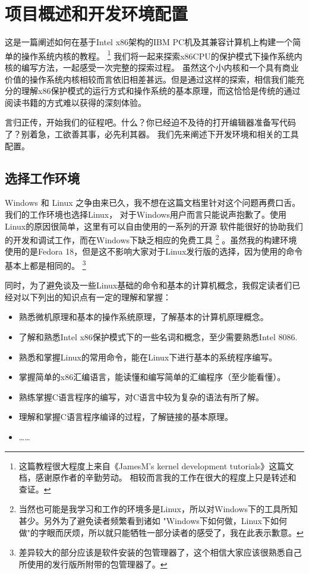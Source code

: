 
\section{项目概述和开发环境配置}

\par 这是一篇阐述如何在基于Intel x86架构的IBM PC机及其兼容计算机上构建一个简单的操作系统内核的教程。\allowbreak
\footnote{这篇教程很大程度上来自《JamesM's kernel development tutorials》这篇文档，感谢原作者的辛勤劳动。\allowbreak
相较而言我的工作在很大的程度上只是转述和查证。}
我们将一起来探索x86CPU的保护模式下操作系统内核的编写方法，一起感受一次完整的探索过程。\allowbreak
虽然这个小内核和一个具有商业价值的操作系统内核相较而言依旧相差甚远。但是通过这样的探索，相信我们能充\allowbreak
分的理解x86保护模式的运行方式和操作系统的基本原理，而这恰恰是传统的通过阅读书籍的方式难以获得的深刻体验。

\par 言归正传，开始我们的征程吧。什么？你已经迫不及待的打开编辑器准备写代码了？别着急，工欲善其事，必先利其器。\allowbreak
我们先来阐述下开发环境和相关的工具配置。

\subsection{选择工作环境}
\par Windows 和 Linux 之争由来已久，我不想在这篇文档里针对这个问题再费口舌。我们的工作环境也选择Linux，\allowbreak
对于Windows用户而言只能说声抱歉了。使用Linux的原因很简单，这里有可以自由使用的一系列的开源\allowbreak
软件能很好的协助我们的开发和调试工作，而在Windows下缺乏相应的免费工具\allowbreak
\footnote {当然也可能是我学习和工作的环境多是Linux，所以对Windows下的工具所知甚少。另外为了避免读者频繁看到诸如\allowbreak
"Windows下如何做，Linux下如何做"的字眼而厌烦，所以就只能牺牲一部分读者的感受了，我在此表示歉意。}
。虽然我的构建环境使用的是Fedora 18，但是这不影响大家对于Linux发行版的选择，因为使用的命令基本上都是相同的。\allowbreak
\footnote {差异较大的部分应该是软件安装的包管理器了，这个相信大家应该很熟悉自己所使用的发行版所附带的包管理器了。}

\par 同时，为了避免谈及一些Linux基础的命令和基本的计算机概念，我假定读者们已经对以下列出的知识点有一定的理解和掌握：
\begin{itemize}
	\item 熟悉微机原理和基本的操作系统原理，了解基本的计算机原理概念。
	\item 了解和熟悉Intel x86保护模式下的一些名词和概念，至少需要熟悉Intel 8086.
	\item 熟悉和掌握Linux的常用命令，能在Linux下进行基本的系统程序编写。
	\item 掌握简单的x86汇编语言，能读懂和编写简单的汇编程序（至少能看懂）。
	\item 熟练掌握C语言程序的编写，对C语言中较为复杂的语法有所了解。
	\item 理解和掌握C语言程序编译的过程，了解链接的基本原理。
	\item ……
\end{itemize}


